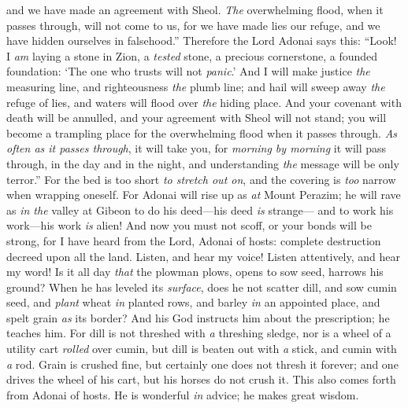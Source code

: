 \begin{biblechapter}
and we have made an agreement with Sheol. \textit{The} overwhelming flood, when it passes through, will not come to us, for we have made lies our refuge, 
and we have hidden ourselves in falsehood.”
\verse Therefore the Lord Adonai says this: “Look! I \textit{am} laying a stone in Zion, 
a \textit{tested} stone, 
a precious cornerstone, 
a founded foundation: ‘The one who trusts will not \textit{panic}.’
\verse And I will make justice \textit{the} measuring line, 
and righteousness \textit{the} plumb line; 
and hail will sweep away \textit{the} refuge of lies, 
and waters will flood over \textit{the} hiding place.
\verse And your covenant with death will be annulled, 
and your agreement with Sheol will not stand; 
you will become a trampling place for the overwhelming flood when it passes through.
\verse \textit{As often as it passes through}, it will take you, 
for \textit{morning by morning} it will pass through, 
in the day and in the night, and understanding \textit{the} message will be only terror.”
\verse For the bed is too short \textit{to stretch out on}, 
and the covering is \textit{too} narrow when wrapping oneself.
\verse For Adonai will rise up as \textit{at} Mount Perazim; 
he will rave as \textit{in the} valley at Gibeon 
to do his deed—his deed \textit{is} strange— 
and to work his work—his work \textit{is} alien!
\verse And now you must not scoff, 
or your bonds will be strong, for I have heard from the Lord, Adonai of hosts: complete destruction 
decreed upon all the land.
 Listen, and hear my voice! 
Listen attentively, and hear my word!
\verse Is it all day \textit{that} the plowman plows, 
opens to sow seed, harrows his ground?
\verse When he has leveled its \textit{surface}, does he not scatter dill, 
and sow cumin seed, 
and \textit{plant} wheat \textit{in} planted rows, 
and barley \textit{in} an appointed place, 
and spelt grain \textit{as} its border?
\verse And his God instructs him about the prescription; 
he teaches him.
\verse For dill is not threshed with \textit{a} threshing sledge, 
nor is a wheel of a utility cart \textit{rolled} over cumin, 
but dill is beaten out with \textit{a} stick, 
and cumin with \textit{a} rod.
\verse Grain is crushed fine, 
but certainly one does not thresh it forever; 
and one drives the wheel of his cart, 
but his horses do not crush it.
\verse This also comes forth from Adonai of hosts. He is wonderful \textit{in} advice; 
he makes great wisdom.
\end{biblechapter}

